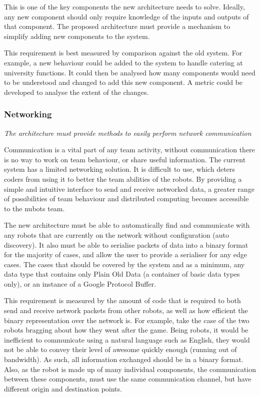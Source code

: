 \documentclass[english,12pt]{scrartcl}
\newcommand{\requirement}[1]{\textit{#1}}
\begin{document}
				This is one of the key components the new architecture needs to solve.
				Ideally, any new component should only require knowledge of the inputs and outputs of that component.
				The proposed architecture must provide a mechanism to simplify adding new components to the system.

				This requirement is best measured by comparison against the old system.
				For example, a new behaviour could be added to the system to handle catering at university functions.
				It could then be analysed how many components would need to be understood and changed to add this new component. A metric could be developed to analyse the extent of the changes.

			\subsubsection{Networking}
				\requirement{The architecture must provide methods to easily perform network
				communication}

				Communication is a vital part of any team activity, without communication there is no way to work on team behaviour, or share useful information.
				The current system has a limited networking solution.
				It is difficult to use, which deters coders from using it to better the team abilities of the robots.
				By providing a simple and intuitive interface to send and receive networked data, a greater range of possibilities of team behaviour and distributed computing becomes accessible to the \gls{nubots} team.

				The new architecture must be able to automatically find and communicate with any robots that are currently on the network without configuration (auto discovery).
				It also must be able to serialise packets of data into a binary format for the majority of cases, and allow the user to provide a serialiser for any edge cases.
				The cases that should be covered by the system and as a minimum, any data type that contains only Plain Old Data (a container of basic data types only), or an instance of a Google Protocol Buffer.

				This requirement is measured by the amount of code that is required to both send and receive network packets from other robots, as well as how efficient the binary representation over the network is.
				For example, take the case of the two robots bragging about how they went after the game.
				Being robots, it would be inefficient to communicate using a natural language such as English, they would not be able to convey their level of awesome quickly enough (running out of bandwidth).
				As such, all information exchanged should be in a binary format.
				Also, as the robot is made up of many individual components, the communication between these components, must use the same communication channel, but have different origin and destination points.
\end{document}
